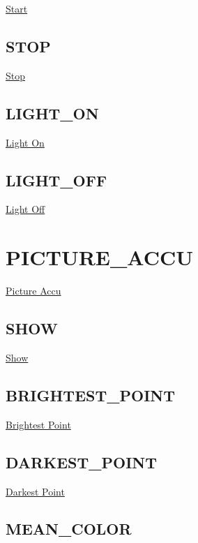 \hyperlink{cmd_doc_Start}{Start}\hypertarget{cmd_structure_CAMERA_STOP}{}\subsection{S\-T\-O\-P}\label{cmd_structure_CAMERA_STOP}
\hyperlink{cmd_doc_Stop}{Stop}\hypertarget{cmd_structure_CAMERA_LIGHT_ON}{}\subsection{L\-I\-G\-H\-T\-\_\-\-O\-N}\label{cmd_structure_CAMERA_LIGHT_ON}
\hyperlink{cmd_doc_LightOn}{Light On}\hypertarget{cmd_structure_CAMERA_LIGHT_OFF}{}\subsection{L\-I\-G\-H\-T\-\_\-\-O\-F\-F}\label{cmd_structure_CAMERA_LIGHT_OFF}
\hyperlink{cmd_doc_LightOff}{Light Off}\hypertarget{cmd_structure_PICTURE_ACCU}{}\section{P\-I\-C\-T\-U\-R\-E\-\_\-\-A\-C\-C\-U}\label{cmd_structure_PICTURE_ACCU}
\hyperlink{modul_doc_PictureAccu}{Picture Accu}\hypertarget{cmd_structure_PICTURE_ACCU_SHOW}{}\subsection{S\-H\-O\-W}\label{cmd_structure_PICTURE_ACCU_SHOW}
\hyperlink{cmd_doc_Show}{Show}\hypertarget{cmd_structure_PICTURE_ACCU_BRIGHTEST_POINT}{}\subsection{B\-R\-I\-G\-H\-T\-E\-S\-T\-\_\-\-P\-O\-I\-N\-T}\label{cmd_structure_PICTURE_ACCU_BRIGHTEST_POINT}
\hyperlink{cmd_doc_BrightestPoint}{Brightest Point}\hypertarget{cmd_structure_PICTURE_ACCU_DARKEST_POINT}{}\subsection{D\-A\-R\-K\-E\-S\-T\-\_\-\-P\-O\-I\-N\-T}\label{cmd_structure_PICTURE_ACCU_DARKEST_POINT}
\hyperlink{cmd_doc_DarkestPoint}{Darkest Point}\hypertarget{cmd_structure_PICTURE_ACCU_MEAN_COLOR}{}\subsection{M\-E\-A\-N\-\_\-\-C\-O\-L\-O\-R}\label{cmd_structure_PICTURE_ACCU_MEAN_COLOR}
